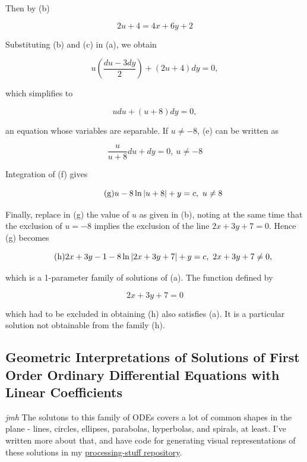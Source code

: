 \documentclass{article}
\begin{document}
Then by (b)

\[ \tag{c} 2u + 4 = 4x +6y + 2 \]

Substituting (b) and (c) in (a), we obtain

\[ \tag{d} u(\frac{du - 3dy}{2}) + (2u + 4)dy = 0, \]

which simplifies to

\[ \tag{e} udu + (u+8)dy = 0, \]

an equation whose variables are separable. If $u \neq -8$, (e) can be written as

\[ \tag{f} \frac{u}{u+8}du + dy = 0,~u \neq -8 \]

Integration of (f) gives

\[ \tag{g} u - 8\ln{\left| u+8 \right|}+y=c,~u \neq 8 \]

Finally, replace in (g) the value of $u$ as given in (b), noting at the same time that the exclusion of $u=-8$ implies the exclusion of the line $2x+3y+7=0$. Hence (g) becomes

\[ \tag{h} 2x +3y -1 -8\ln{\left| 2x+3y+7 \right|}+y=c,~2x+3y+7\neq0, \]

which is a 1-parameter family of solutions of (a). The function defined by

\[ \tag{i} 2x + 3y + 7 = 0 \]

which had to be excluded in obtaining (h) also satisfies (a). It is a particular solution not obtainable from the family (h).

\subsection{Geometric Interpretations of Solutions of First Order Ordinary Differential Equations with Linear Coefficients}
\emph{jmh}
The solutons to this family of ODEs covers a lot of common shapes in the plane - lines, circles, ellipses, parabolas, hyperbolas, and spirals, at least. I've written more about that, and have code for generating visual representations of these solutions in my \href{https://github.com/jhobbs/processing-stuff/blob/master/notes.md}{processing-stuff repository}.
\end{document}
